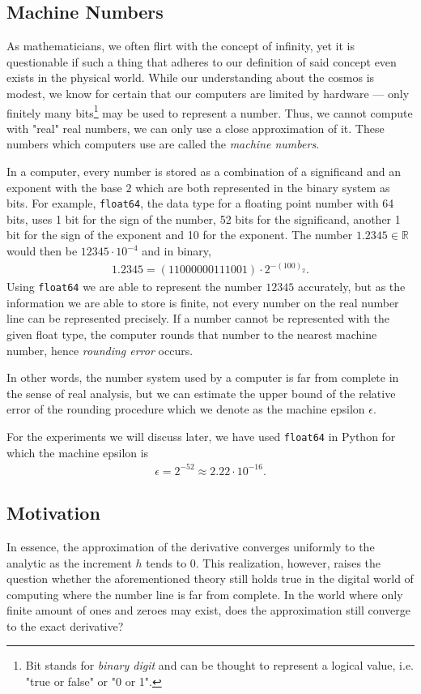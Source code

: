 \subsection{Machine Numbers}

As mathematicians, we often flirt with the concept of infinity, yet it is questionable if such a thing that adheres to our definition of said concept even exists in the physical world. While our understanding about the cosmos is modest, we know for certain that our computers are limited by hardware --- only finitely many bits\footnote{Bit stands for \textit{binary digit} and can be thought to represent a logical value, i.e. "true or false" or "0 or 1".} may be used to represent a number. Thus, we cannot compute with "real" real numbers, we can only use a close approximation of it. These numbers which computers use are called the \textit{machine numbers}.

In a computer, every number is stored as a combination of a significand and an exponent with the base \(2\) which are both represented in the binary system as bits. For example, \texttt{float64}, the data type for a floating point number with 64 bits, uses 1 bit for the sign of the number, 52 bits for the significand, another 1 bit for the sign of the exponent and 10 for the exponent. The number \(1.2345 \in \mathbb{R}\) would then be \(12345 \cdot 10^{-4}\) and in binary,
\begin{align*}
    1.2345 = (11000000111001) \cdot 2^{-(100)_2}\text{.}
\end{align*}
Using \texttt{float64} we are able to represent the number \(12345\) accurately, but as the information we are able to store is finite, not every number on the real number line can be represented precisely. If a number cannot be represented with the given float type, the computer rounds that number to the nearest machine number, hence \textit{rounding error} occurs.

In other words, the number system used by a computer is far from complete in the sense of real analysis, but we can estimate the upper bound of the relative error of the rounding procedure which we denote as the machine epsilon \(\epsilon\).

For the experiments we will discuss later, we have used \texttt{float64} in Python for which the machine epsilon is
\begin{align*}
    \epsilon = 2^{-52} \approx 2.22 \cdot 10^{-16} \text{.}
\end{align*}

\subsection{Motivation}
In essence, the approximation of the derivative converges uniformly to the analytic as the increment \(h\) tends to \(0\). This realization, however, raises the question whether the aforementioned theory still holds true in the digital world of computing where the number line is far from complete. In the world where only finite amount of ones and zeroes may exist, does the approximation still converge to the exact derivative?\\